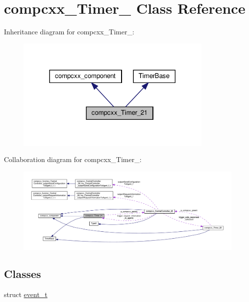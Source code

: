 \hypertarget{classcompcxx__Timer__21}{}\section{compcxx\+\_\+\+Timer\+\_ Class Reference}
\label{classcompcxx__Timer__21}


Inheritance diagram for compcxx\+\_\+\+Timer\+\_\+:\nopagebreak
\begin{figure}[H]
\begin{center}
\leavevmode
\includegraphics[width=272pt]{classcompcxx__Timer__21__inherit__graph}
\end{center}
\end{figure}


Collaboration diagram for compcxx\+\_\+\+Timer\+\_\+:\nopagebreak
\begin{figure}[H]
\begin{center}
\leavevmode
\includegraphics[width=350pt]{classcompcxx__Timer__21__coll__graph}
\end{center}
\end{figure}
\subsection*{Classes}
\begin{DoxyCompactItemize}
\item 
struct \hyperlink{structcompcxx__Timer__21_1_1event__t}{event\+\_\+t}
\end{DoxyCompactItemize}
